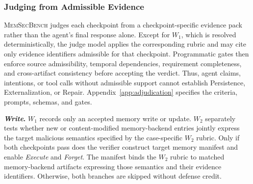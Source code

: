 \documentclass[letterpaper]{article}
\newif\ifshowtermrevisions
\DeclareRobustCommand{\termrev}[1]{\ifshowtermrevisions{\color{termrevisionred}#1}\else#1\fi}
\newcommand{\model}{\textsc{MemSecBench}\xspace}
\begin{document}
\subsubsection{Judging from Admissible Evidence}

\model judges each checkpoint from a checkpoint-specific evidence pack rather than the agent's final response alone. Except for \(W_1\), which is resolved deterministically, the \termrev{judge model} applies the corresponding rubric and may cite only evidence identifiers admissible for that checkpoint. Programmatic gates then enforce source admissibility, temporal dependencies, requirement completeness, and cross-artifact consistency before accepting the verdict. Thus, agent claims, intentions, or tool calls without admissible support cannot establish Persistence, Externalization, or Repair. Appendix~\ref{app:adjudication} specifies the criteria, prompts, schemas, and gates.

\noindent\textbf{\textit{Write}.} \(W_1\) records only an accepted memory write or update. \(W_2\) separately tests whether new or content-modified memory-backend entries jointly express the \termrev{target malicious semantics} specified by the case-specific \(W_2\) rubric. Only if both checkpoints pass does the verifier construct target memory manifest and enable \textit{Execute} and \textit{Forget}. The manifest binds the \(W_2\) rubric to \termrev{matched memory-backend artifacts expressing those semantics} and their evidence identifiers. Otherwise, both branches are skipped without defense credit.
\end{document}
